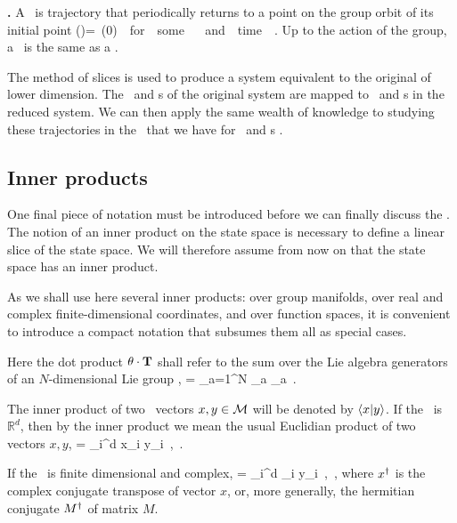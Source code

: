 {\begin{definition}
\textbf{\Rpo.}
A \rpo\ is trajectory that periodically returns to a point on the group orbit of its initial point
\beq
\ssp(\tau*)=\LieEl \, \ssp(0) \,\, for \,\,  some \,\, \LieEl \in \Group \,\, and \,\, time \,\, \tau*.
\eeq
Up to the action of the group, a \rpo\ is the same as a \po.
\end{definition}

The method of slices is used to produce a system equivalent to the original of lower dimension. The \reqva\ and \rpo s of the original system are mapped to \eqva\ and \po s in the reduced system. We can then apply the same wealth of knowledge to studying these trajectories in the \reducedsp\ that we have for \eqva\ and \po s .
    \ifarticle
    \else


\subsection{Inner products}
\label{def:innerProduct}

One final piece of notation must be introduced before we can finally discuss the \mslices.
The notion of an inner product on the state space is necessary to define a linear slice of the state space. We will therefore assume from now on that the state space has an inner product.

As we shall use here several inner products:
over group manifolds, over real and complex finite-dimensional coordinates, and over function spaces, it is convenient to introduce a compact notation that subsumes them all as special cases.

Here the dot product ${\bf \theta} \cdot \mathbf{T}$ shall refer to the sum over
the Lie algebra generators of an $N$-dimensional Lie group \Group,
\beq
\gSpace \cdot \Lg = \sum_{a=1}^N \gSpace_a \Lg_a
\,.

The inner product of two \statesp\ vectors $x, y \in {\cal M}$ will be denoted by $\left\langle {x}|{y} \right\rangle$. If the \statesp\ is $\mathbb{R}^d$, then by the inner product we mean the usual Euclidian product of two vectors $x,y$,
\beq
{} = \sum_i^d {x}_i y_i
    \,,\qquad \pS \subset \reals
\,.

If the \statesp\ is finite dimensional and complex,
\beq
{} = \sum_i^d _i y_i
    \,,\qquad \pS \subset \complex
\,,
where ${x}^\dag$ is the complex conjugate transpose of vector $x$, or, more generally, the hermitian conjugate ${M}^\dag$ of matrix $M$.

}
